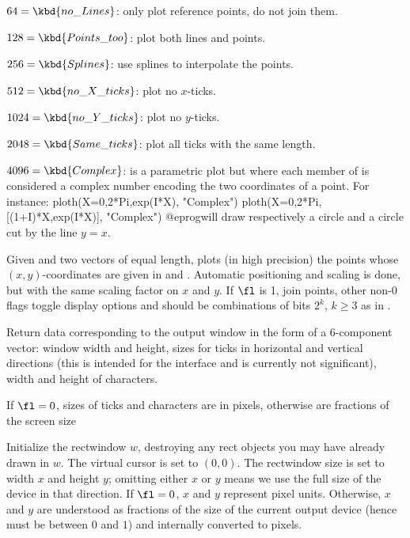 \item $64 = \kbd{no\_Lines}$: only plot reference points, do not join them.

\item $128 = \kbd{Points\_too}$: plot both lines and points.

\item $256 = \kbd{Splines}$: use splines to interpolate the points.

\item $512 = \kbd{no\_X\_ticks}$: plot no $x$-ticks.

\item $1024 = \kbd{no\_Y\_ticks}$: plot no $y$-ticks.

\item $2048 = \kbd{Same\_ticks}$: plot all ticks with the same length.

\item $4096 = \kbd{Complex}$: is a parametric plot but where each member of
 is considered a complex number encoding the two coordinates of a
point. For instance:
\bprog
ploth(X=0,2*Pi,exp(I*X), "Complex")
ploth(X=0,2*Pi,[(1+I)*X,exp(I*X)], "Complex")
@eprog\noindent will draw respectively a circle and a circle cut by the line
$y=x$.

\label{se:plothraw}
Given  and  two vectors of equal length, plots (in
high precision) the points whose $(x,y)$-coordinates are given in
 and . Automatic positioning and scaling is done, but
with the same scaling factor on $x$ and $y$. If $\fl$ is 1, join points,
other non-0 flags toggle display options and should be combinations of bits
$2^k$, $k \geq 3$ as in .

\label{se:plothsizes}
Return data corresponding to the output window
in the form of a 6-component vector: window width and height, sizes for ticks
in horizontal and vertical directions (this is intended for the 
interface and is currently not significant), width and height of characters.

If $\fl = 0$, sizes of ticks and characters are in
pixels, otherwise are fractions of the screen size

\label{se:plotinit}
Initialize the rectwindow $w$,
destroying any rect objects you may have already drawn in $w$. The virtual
cursor is set to $(0,0)$. The rectwindow size is set to width $x$ and height
$y$; omitting either $x$ or $y$ means we use the full size of the device
in that direction.
If $\fl=0$, $x$ and $y$ represent pixel units. Otherwise, $x$ and $y$
are understood as fractions of the size of the current output device (hence
must be between $0$ and $1$) and internally converted to pixels.

